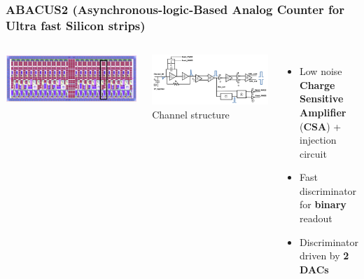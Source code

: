 \documentclass[aspectratio=169]{beamer}
\begin{document}
	\begin{frame}
	\frametitle{ABACUS2 ({\small \textbf{A}synchronous-logic-\textbf{B}ased \textbf{A}nalog \textbf{C}ounter for \textbf{U}ltra fast \textbf{S}ilicon strips}) }
	\vspace*{-2mm}
	\begin{columns}
		\begin{center}
				\includegraphics[width=2.45 \textwidth, angle=90]{IMG/ABACUS2.png}
		\end{center}
		\begin{columns}
			\vspace*{1.0mm}
			\includegraphics[width=0.99 \textwidth]{IMG/ABACUS_channel.PNG}
			{\color{blue} Channel structure }
			{\footnotesize 
			\begin{itemize}
				\item Low noise \textbf{Charge Sensitive Amplifier} (\textbf{CSA}) + injection circuit
				\item Fast discriminator for \textbf{binary} readout
				\item Discriminator driven by \textbf{2 DACs}
				\begin{itemize}
					{\footnotesize
}
\end{itemize}
\end{itemize}}
\end{columns}
\end{columns}
\end{frame}
\end{document}
